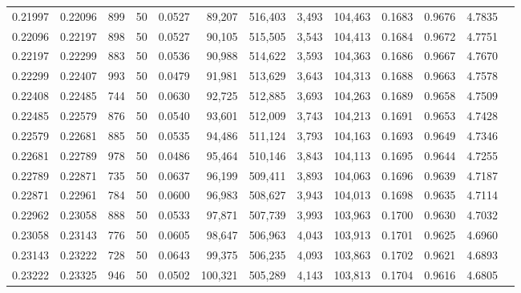 \begin{tabular}{rrrrrrrrrrrrr}
0.21997 & 0.22096 &   899 &  50 &                                     0.0527 &  89,207 & 516,403 &   3,493 & 104,463 & 0.1683 & 0.9676 & 4.7835 \\
0.22096 & 0.22197 &   898 &  50 &                                     0.0527 &  90,105 & 515,505 &   3,543 & 104,413 & 0.1684 & 0.9672 & 4.7751 \\
0.22197 & 0.22299 &   883 &  50 &                                     0.0536 &  90,988 & 514,622 &   3,593 & 104,363 & 0.1686 & 0.9667 & 4.7670 \\
0.22299 & 0.22407 &   993 &  50 &                                     0.0479 &  91,981 & 513,629 &   3,643 & 104,313 & 0.1688 & 0.9663 & 4.7578 \\
0.22408 & 0.22485 &   744 &  50 &                                     0.0630 &  92,725 & 512,885 &   3,693 & 104,263 & 0.1689 & 0.9658 & 4.7509 \\
0.22485 & 0.22579 &   876 &  50 &                                     0.0540 &  93,601 & 512,009 &   3,743 & 104,213 & 0.1691 & 0.9653 & 4.7428 \\
0.22579 & 0.22681 &   885 &  50 &                                     0.0535 &  94,486 & 511,124 &   3,793 & 104,163 & 0.1693 & 0.9649 & 4.7346 \\
0.22681 & 0.22789 &   978 &  50 &                                     0.0486 &  95,464 & 510,146 &   3,843 & 104,113 & 0.1695 & 0.9644 & 4.7255 \\
0.22789 & 0.22871 &   735 &  50 &                                     0.0637 &  96,199 & 509,411 &   3,893 & 104,063 & 0.1696 & 0.9639 & 4.7187 \\
0.22871 & 0.22961 &   784 &  50 &                                     0.0600 &  96,983 & 508,627 &   3,943 & 104,013 & 0.1698 & 0.9635 & 4.7114 \\
0.22962 & 0.23058 &   888 &  50 &                                     0.0533 &  97,871 & 507,739 &   3,993 & 103,963 & 0.1700 & 0.9630 & 4.7032 \\
0.23058 & 0.23143 &   776 &  50 &                                     0.0605 &  98,647 & 506,963 &   4,043 & 103,913 & 0.1701 & 0.9625 & 4.6960 \\
0.23143 & 0.23222 &   728 &  50 &                                     0.0643 &  99,375 & 506,235 &   4,093 & 103,863 & 0.1702 & 0.9621 & 4.6893 \\
0.23222 & 0.23325 &   946 &  50 &                                     0.0502 & 100,321 & 505,289 &   4,143 & 103,813 & 0.1704 & 0.9616 & 4.6805 \\

\end{tabular}
